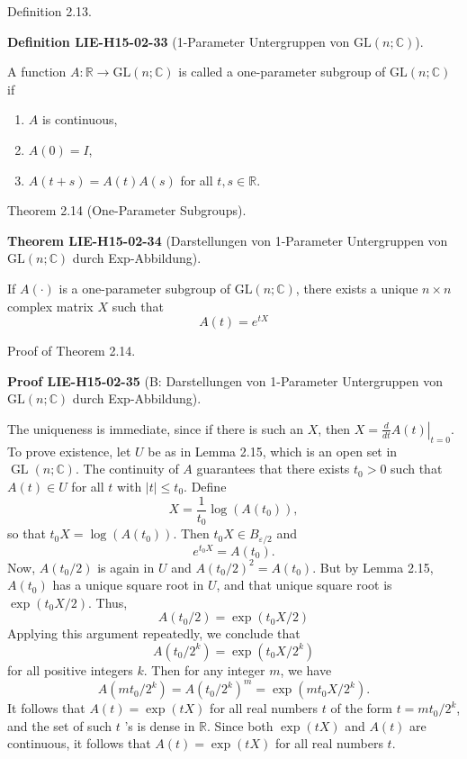 \documentclass[10pt, letterpaper]{article}
\newcommand{\C}{\mathbb{C}}
\newcommand{\GL}{\mathrm{GL}}
\newcommand{\CustomHeading}[3]{%
  \par\medskip\noindent%
  \textbf{#1 #2} \textnormal{(#3)}.\enskip%
}
\newenvironment{DEF}[2]{\begin{unitbox}\CustomHeading{Definition}{#1}{#2}}{\end{unitbox}}
\newenvironment{THEO}[2]{\begin{unitbox}\CustomHeading{Theorem}{#1}{#2}}{\end{unitbox}}
\newenvironment{PROOF}[2]{\begin{unitbox}\CustomHeading{Proof}{#1}{#2}}{\end{unitbox}}
\begin{document}
Definition 2.13. 

\begin{DEF}{LIE-H15-02-33}{1-Parameter Untergruppen von $\GL(n;\C)$}
A function $A: \mathbb{R} \rightarrow \mathrm{GL}(n ; \mathbb{C})$ is called a one-parameter subgroup of $\mathrm{GL}(n ; \mathbb{C})$ if
\begin{enumerate}
  \item $A$ is continuous,
  \item $A(0)=I$,
  \item $A(t+s)=A(t) A(s)$ for all $t, s \in \mathbb{R}$.
\end{enumerate}
\end{DEF}

Theorem 2.14 (One-Parameter Subgroups). 

\begin{THEO}{LIE-H15-02-34}{Darstellungen von 1-Parameter Untergruppen von $\GL(n;\C)$ durch Exp-Abbildung}
If $A(\cdot)$ is a one-parameter subgroup of $\mathrm{GL}(n ; \mathbb{C})$, there exists a unique $n \times n$ complex matrix $X$ such that
$$
A(t)=e^{t X}
$$
\end{THEO}

Proof of Theorem 2.14. 

\begin{PROOF}{LIE-H15-02-35}{B: Darstellungen von 1-Parameter Untergruppen von $\GL(n;\C)$ durch Exp-Abbildung}
The uniqueness is immediate, since if there is such an $X$, then $X=\left.\frac{d}{d t} A(t)\right|_{t=0}$. To prove existence, let $U$ be as in Lemma 2.15, which is an open set in $\operatorname{GL}(n ; \mathbb{C})$. The continuity of $A$ guarantees that there exists $t_{0}>0$ such that $A(t) \in U$ for all $t$ with $|t| \leq t_{0}$. Define
$$
X=\frac{1}{t_{0}} \log \left(A\left(t_{0}\right)\right),
$$
so that $t_{0} X=\log \left(A\left(t_{0}\right)\right)$. Then $t_{0} X \in B_{\varepsilon / 2}$ and
$$
e^{t_{0} X}=A\left(t_{0}\right) .
$$
Now, $A\left(t_{0} / 2\right)$ is again in $U$ and $A\left(t_{0} / 2\right)^{2}=A\left(t_{0}\right)$. But by Lemma 2.15, $A\left(t_{0}\right)$ has a unique square root in $U$, and that unique square root is $\exp \left(t_{0} X / 2\right)$. Thus,
$$
A\left(t_{0} / 2\right)=\exp \left(t_{0} X / 2\right)
$$
Applying this argument repeatedly, we conclude that
$$
A\left(t_{0} / 2^{k}\right)=\exp \left(t_{0} X / 2^{k}\right)
$$
for all positive integers $k$. Then for any integer $m$, we have
$$
A\left(m t_{0} / 2^{k}\right)=A\left(t_{0} / 2^{k}\right)^{m}=\exp \left(m t_{0} X / 2^{k}\right) .
$$
It follows that $A(t)=\exp (t X)$ for all real numbers $t$ of the form $t=m t_{0} / 2^{k}$, and the set of such $t$ 's is dense in $\mathbb{R}$. Since both $\exp (t X)$ and $A(t)$ are continuous, it follows that $A(t)=\exp (t X)$ for all real numbers $t$.
\end{PROOF}
\end{document}
